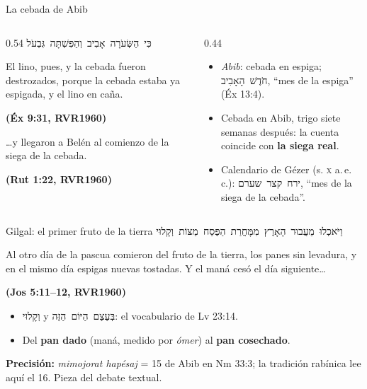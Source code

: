 \documentclass[hyperref={bookmarks=false},aspectratio=169]{beamer}
\newcommand{\heb}[1]{\mbox{\foreignlanguage{hebrew}{#1}}}
\newcommand{\fuente}[1]{\par\hfill{\upshape\bfseries\footnotesize\textcolor{tierraroja}{#1}}}
\newcommand{\destacar}[1]{\textbf{\textcolor{tierraroja}{#1}}}
\newcommand{\precision}[1]{{\footnotesize\color{sepia}\textbf{Precisión:} #1}}
\begin{document}
\begin{frame}{La cebada de Abib}
\begin{columns}[t,onlytextwidth]
\begin{column}{0.54\textwidth}
\centering\heb{כִּי הַשְּׂעֹרָה אָבִיב וְהַפִּשְׁתָּה גִּבְעֹל}
\begin{cita}El lino, pues, y la cebada fueron destrozados, porque la cebada estaba ya espigada, y el lino en caña.\fuente{(Éx 9:31, RVR1960)}\end{cita}
\begin{cita}\ldots{}y llegaron a Belén al comienzo de la siega de la cebada.\fuente{(Rut 1:22, RVR1960)}\end{cita}
\end{column}
\begin{column}{0.44\textwidth}\small\RaggedRight
\begin{itemize}
\item \emph{Abib}: cebada en espiga; \heb{חֹדֶשׁ הָאָבִיב}, ``mes de la espiga'' (Éx 13:4).
\item Cebada en Abib, trigo siete semanas después: la cuenta coincide con \destacar{la siega real}.
\item Calendario de Gézer (s. \textsc{x} a.\,e.\,c.): \heb{ירח קצר שערם}, ``mes de la siega de la cebada''.
\end{itemize}
\end{column}
\end{columns}
\end{frame}

\begin{frame}{Gilgal: el primer fruto de la tierra}
\centering\heb{וַיֹּאכְלוּ מֵעֲבוּר הָאָרֶץ מִמָּחֳרַת הַפֶּסַח מַצּוֹת וְקָלוּי}
\begin{cita}Al otro día de la pascua comieron del fruto de la tierra, los panes sin levadura, y en el mismo día espigas nuevas tostadas. Y el maná cesó el día siguiente\ldots\fuente{(Jos 5:11--12, RVR1960)}\end{cita}
\small\RaggedRight
\begin{itemize}
\item \heb{וְקָלוּי} y \heb{בְּעֶצֶם הַיּוֹם הַזֶּה}: el vocabulario de Lv 23:14.
\item Del \destacar{pan dado} (maná, medido por \emph{ómer}) al \destacar{pan cosechado}.
\end{itemize}
\precision{\emph{mimojorat hapésaj} = 15 de Abib en Nm 33:3; la tradición rabínica lee aquí el 16. Pieza del debate textual.}
\end{frame}
\end{document}
